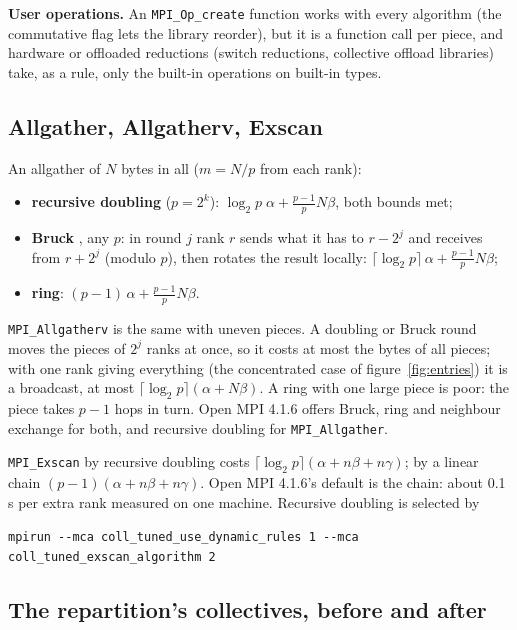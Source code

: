 \documentclass[10pt,a4paper]{article}
\theoremstyle{definition}
\newcommand{\fn}[1]{\texttt{#1}}
\begin{document}
\textbf{User operations.} An \fn{MPI\_Op\_create} function works with every
algorithm (the commutative flag lets the library reorder), but it is a
function call per piece, and hardware or offloaded reductions (switch
reductions, collective offload libraries) take, as a rule, only the
built-in operations on built-in types.

\subsection{Allgather, Allgatherv, Exscan}

An allgather of $N$ bytes in all ($m = N/p$ from each rank):
\begin{itemize}
  \item \textbf{recursive doubling} ($p = 2^k$): $\log_2 p\;\alpha +
    \frac{p-1}{p}N\beta$, both bounds met;
  \item \textbf{Bruck} \cite{bruck}, any $p$: in round $j$ rank $r$ sends
    what it has to $r - 2^j$ and receives from $r + 2^j$ (modulo $p$), then
    rotates the result locally: $\lceil\log_2 p\rceil\,\alpha +
    \frac{p-1}{p}N\beta$;
  \item \textbf{ring}: $(p-1)\,\alpha + \frac{p-1}{p}N\beta$.
\end{itemize}
\fn{MPI\_Allgatherv} is the same with uneven pieces. A doubling or Bruck
round moves the pieces of $2^j$ ranks at once, so it costs at most the
bytes of all pieces; with one rank giving everything (the concentrated
case of figure~\ref{fig:entries}) it is a broadcast, at most
$\lceil\log_2 p\rceil(\alpha + N\beta)$. A ring with one large piece is
poor: the piece takes $p - 1$ hops in turn. Open MPI 4.1.6 offers Bruck,
ring and neighbour exchange for both, and recursive doubling for
\fn{MPI\_Allgather}.

\fn{MPI\_Exscan} by recursive doubling costs $\lceil\log_2 p\rceil(\alpha +
n\beta + n\gamma)$; by a linear chain $(p-1)(\alpha + n\beta + n\gamma)$.
Open MPI 4.1.6's default is the chain: about 0.1\,\textmu s per extra rank
measured on one machine. Recursive doubling is selected by
\begin{center}
  \fn{mpirun -{}-mca coll\_tuned\_use\_dynamic\_rules 1 -{}-mca
  coll\_tuned\_exscan\_algorithm 2}
\end{center}

\subsection{The repartition's collectives, before and after}
\end{document}
